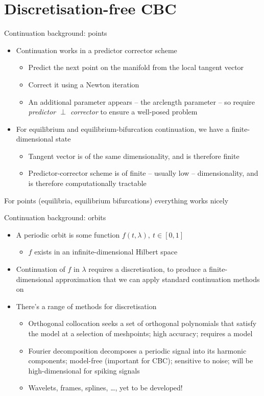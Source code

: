 \documentclass[presentation]{beamer}
\begin{document}
\section{Discretisation-free CBC}
\label{sec:orge826b21}
\begin{frame}[label={sec:org5c3acf8}]{Continuation background: points}
\begin{itemize}
\item Continuation works in a predictor corrector scheme
\begin{itemize}
\item Predict the next point on the manifold from the local tangent vector
\item Correct it using a Newton iteration
\item An additional parameter appears -- the arclength parameter -- so require \emph{predictor \(\perp\) corrector} to ensure a well-posed problem
\end{itemize}
\item For equilibrium and equilibrium-bifurcation continuation, we have a finite-dimensional state
\begin{itemize}
\item Tangent vector is of the same dimensionality, and is therefore finite
\item Predictor-corrector scheme is of finite -- usually low -- dimensionality, and is therefore computationally tractable
\end{itemize}
\end{itemize}

For points (equilibria, equilibrium bifurcations) everything works nicely
\end{frame}

\begin{frame}[label={sec:orgcd31c37}]{Continuation background: orbits}
\begin{itemize}
\item A periodic orbit is some function \(f(t,\lambda),~t\in[0,1]\)
\begin{itemize}
\item \(f\) exists in an infinite-dimensional Hilbert space
\end{itemize}
\item Continuation of \(f\) in \(\lambda\) requires a discretisation, to produce a finite-dimensional approximation that we can apply standard continuation methods on
\item There's a range of methods for discretisation
\begin{itemize}
\item Orthogonal collocation seeks a set of orthogonal polynomials that satisfy the model at a selection of meshpoints; high accuracy; requires a model
\item Fourier decomposition decomposes a periodic signal into its harmonic components; model-free (important for CBC); sensitive to noise; will be high-dimensional for spiking signals
\item Wavelets, frames, splines, \dots{}, yet to be developed!
\end{itemize}
\end{itemize}
\end{frame}
\end{document}
